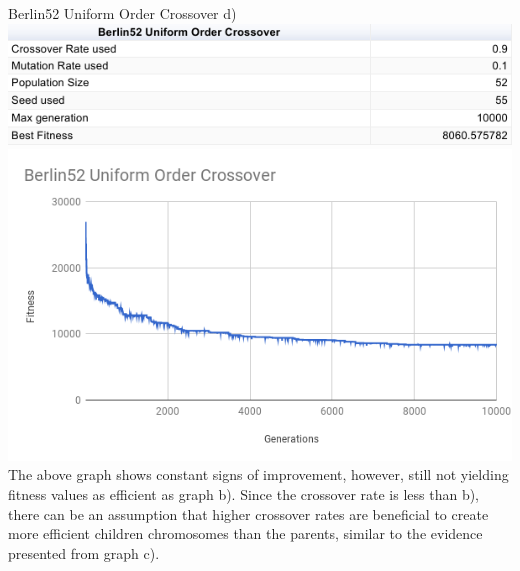 \documentclass[conference]{IEEEtran}
\begin{document}
Berlin52 Uniform Order Crossover d)
\includegraphics[scale=0.42]{Berlin52/UOC/Berlin52_UOC_d)_table}
\includegraphics[scale=0.42]{Berlin52/UOC/Berlin52_UOC_d)}
The above graph shows constant signs of improvement, however, still not yielding fitness values as efficient as graph b). Since the crossover rate is less than b), there can be an assumption that higher crossover rates are beneficial to create more efficient children chromosomes than the parents, similar to the evidence presented from graph c).\\
\end{document}
